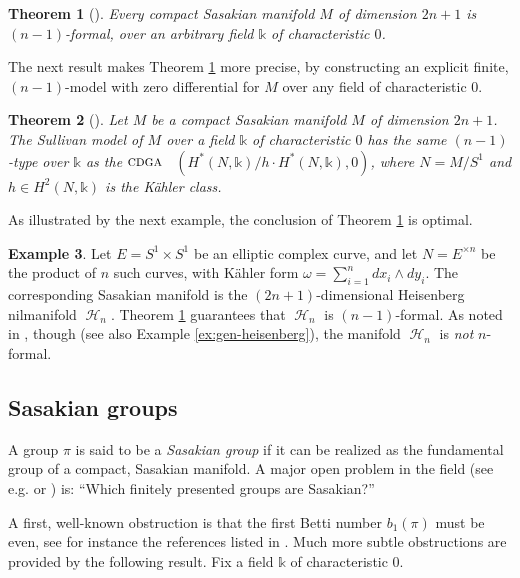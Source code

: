 \documentclass{article}
\numberwithin{equation}{section}
\newtheorem{theorem}{Theorem}[section]
\theoremstyle{definition}
\newtheorem{example}[theorem]{Example}
\renewcommand{\k}{\mathbb{k}}
\newcommand{\cdga}{\ensuremath{\textsc{cdga}}}
\DeclareMathOperator{\Heis}{\mathcal{H}}
\begin{document}
\begin{theorem}[\cite{PS-imrn19}]
\label{thm:highf}
Every compact Sasakian manifold $M$ of dimension $2n+1$ is 
$(n-1)$-formal, over an arbitrary field $\k$ of characteristic $0$. 
\end{theorem}

The next result makes Theorem \ref{thm:highf} more precise, 
by constructing an explicit finite, $(n-1)$-model with zero differential 
for $M$ over any field of characteristic $0$. 

\begin{theorem}[\cite{PS-imrn19}]
\label{thm:highf-bis}
Let $M$ be a compact Sasakian manifold $M$ of dimension $2n+1$. 
The Sullivan model of $M$ over a field $\k$ of 
characteristic $0$ has the same $(n-1)$-type over $\k$ as the \cdga~
$(H^{*}(N,\k)/h\cdot H^{*}(N,\k), 0)$, 
where $N=M/S^1$ and $h\in H^2(N, \k)$ is the K\"ahler class.
\end{theorem}

As illustrated by the next example, the conclusion of 
Theorem  \ref{thm:highf} is optimal. 

\begin{example}
\label{ex:heis-sasaki}
Let $E=S^1\times S^1$ be an elliptic complex curve, and let $N=E^{\times n}$ 
be the product of $n$ such curves, with K\"{a}hler form $\omega=\sum_{i=1}^n 
dx_i \wedge dy_i$.  The corresponding Sasakian manifold is the 
$(2n+1)$-dimensional Heisenberg nilmanifold $\Heis_n$. 
Theorem \ref{thm:highf} guarantees that $\Heis_n$ is $(n-1)$-formal. 
As noted in \cite{Mc10}, though (see also 
Example \ref{ex:gen-heisenberg}), the manifold $\Heis_n$ is 
{\em not}\/ $n$-formal. 
\end{example}

\subsection{Sasakian groups}
\label{subsec:sasgp}

A group $\pi$ is said to be a {\em Sasakian group}\/ if it 
can be realized as the fundamental group of a compact, 
Sasakian manifold.  A major open problem in the field 
(see e.g. \cite[Chapter 7]{BG} or \cite{Chen13}) is:
``Which finitely presented groups are Sasakian?''

A first, well-known obstruction is that the first Betti number $b_1(\pi)$ 
must be even, see for instance the references listed in \cite{Chen13}.  
Much more subtle obstructions are provided by the following result.  
Fix a field $\k$ of characteristic $0$.
\end{document}
